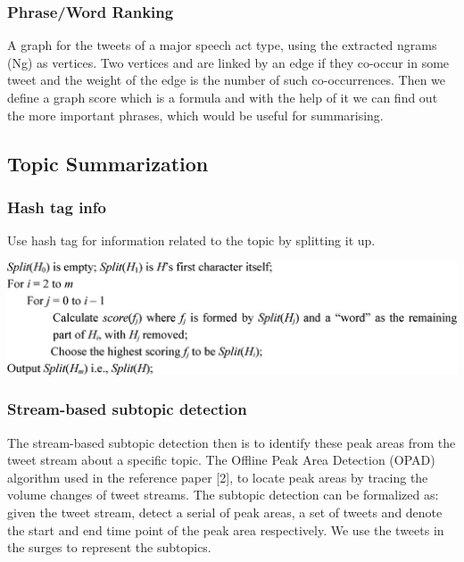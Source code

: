 \documentclass[conference]{IEEEtran}
\begin{document}
\subsubsection{\textbf{Phrase/Word Ranking}}
\par A graph for the tweets of a major speech act type, using the extracted ngrams (Ng) as vertices. Two vertices and are linked by an edge if they co-occur in some tweet and the weight of the edge is the number of such co-occurrences. Then we define a graph score which is a formula and with the help of it we can find out the more important phrases, which would be useful for summarising.

\subsection{\textbf{Topic Summarization}}
\subsubsection{\textbf{Hash tag info}}
\par Use hash tag for information related to the topic by splitting it up.

\begin{center}
\includegraphics[scale=0.3]{hashtag.jpg}
\end{center}

\subsubsection{\textbf{Stream-based subtopic detection}}
\par The stream-based subtopic detection then is to identify these peak areas from the tweet stream about a specific topic. The Offline Peak Area Detection (OPAD) algorithm used in the reference paper [2], to locate peak areas by tracing the volume changes of tweet streams. The subtopic detection can be formalized as: given the tweet stream, detect a serial of peak areas, a set of tweets and denote the start and end time point of the peak area respectively. We use the tweets in the surges to represent the subtopics.
\end{document}
